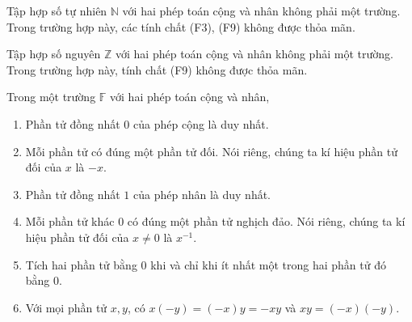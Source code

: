 \begin{counterexample}
    Tập hợp số tự nhiên $\mathbb{N}$ với hai phép toán cộng và nhân không phải một trường. Trong trường hợp này, các tính chất (F3), (F9) không được thỏa mãn.

    \noindent Tập hợp số nguyên $\mathbb{Z}$ với hai phép toán cộng và nhân không phải một trường. Trong trường hợp này, tính chất (F9) không được thỏa mãn.
\end{counterexample}

\begin{theorem}\label{theorem:field-properties}
    Trong một trường $\mathbb{F}$ với hai phép toán cộng và nhân,
    \begin{enumerate}[label={(\roman*)},itemsep=0pt]
        \item Phần tử đồng nhất $0$ của phép cộng là duy nhất.
        \item Mỗi phần tử có đúng một phần tử đối. Nói riêng, chúng ta kí hiệu phần tử đối của $x$ là $-x$.
        \item Phần tử đồng nhất $1$ của phép nhân là duy nhất.
        \item Mỗi phần tử khác $0$ có đúng một phần tử nghịch đảo. Nói riêng, chúng ta kí hiệu phần tử đối của $x\ne 0$ là $x^{-1}$.
        \item Tích hai phần tử bằng $0$ khi và chỉ khi ít nhất một trong hai phần tử đó bằng $0$.
        \item Với mọi phần tử $x, y$, có $x(-y) = (-x)y = -xy$ và $xy = (-x)(-y)$.
    \end{enumerate}
\end{theorem}

